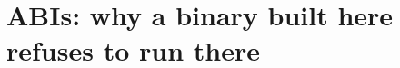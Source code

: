 \chapter{ABIs: why a binary built here refuses to run there}
\label{ch:abis-why-a-binary-built-here-refuses-to}

